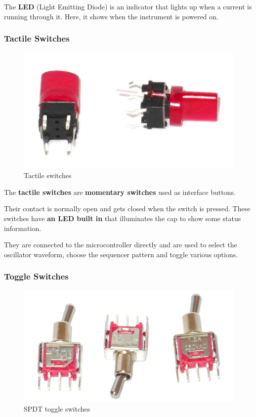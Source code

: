 \documentclass{scrartcl}
\begin{document}
The \textbf{LED} (Light Emitting Diode) is an indicator that lights up when a current is running through it.
Here, it shows when the instrument is powered on.

\subsubsection{Tactile Switches}

\begin{figure}[!ht]
    \begin{center}
        \includegraphics[scale=0.20]{assets/zekit-tacts.jpg}
        \caption{Tactile switches}
    \end{center}
\end{figure}

The \textbf{tactile switches} are \textbf{momentary switches} used as interface buttons.

Their contact is normally open and gets closed when the switch is pressed. These switches have \textbf{an LED built in} that illuminates the cap to show some status information.

They are connected to the microcontroller directly and are used to select the oscillator waveform, choose the sequencer pattern and toggle various options.

\subsubsection{Toggle Switches}

\begin{figure}[!ht]
    \begin{center}
        \includegraphics[scale=0.16]{assets/zekit-toggles.jpg}
        \caption{SPDT toggle switches}
    \end{center}
\end{figure}
\end{document}
